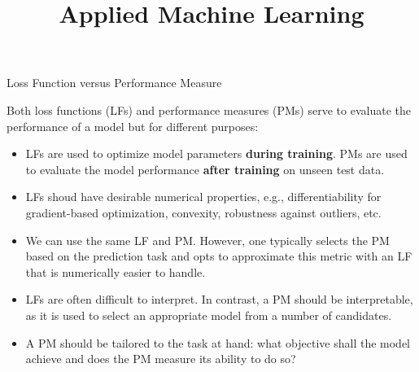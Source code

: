 \documentclass[11pt,compress,t,notes=noshow, aspectratio=169, xcolor=table]{beamer}
\title{Applied Machine Learning}
\date{}
\begin{document}
\newcommand{\titlefigure}{figure/dtrain_dtest_resampling}
\newcommand{\learninggoals}{
\item What is the difference between a loss function and a performance metric?
\item What are desirable properties of a performance metric?
\item What are guiding questions to select a performance metric?}


\begin{frame}{Loss Function versus Performance Measure}

Both loss functions (LFs) and performance measures (PMs) serve to evaluate the performance of a model but for different purposes:
\vspace{0.5cm}
\begin{itemize}
    \itemsep1em
    \item LFs are used to optimize model parameters \textbf{during training}. PMs are used to evaluate the model performance \textbf{after training} on unseen test data.
    \item LFs shoud have desirable numerical properties, e.g., differentiability for gradient-based optimization, convexity, robustness against outliers, etc.
    \item We can use the same LF and PM. However, one typically selects the PM based on the prediction task and opts to approximate this metric with an LF that is numerically easier to handle.
    \item LFs are often difficult to interpret. In contrast, a PM should be interpretable, as it is used to select an appropriate model from a number of candidates.
    \item A PM should be tailored to the task at hand: what objective shall the model achieve and does the PM measure its ability to do so?
\end{itemize}
\end{frame}
\end{document}

